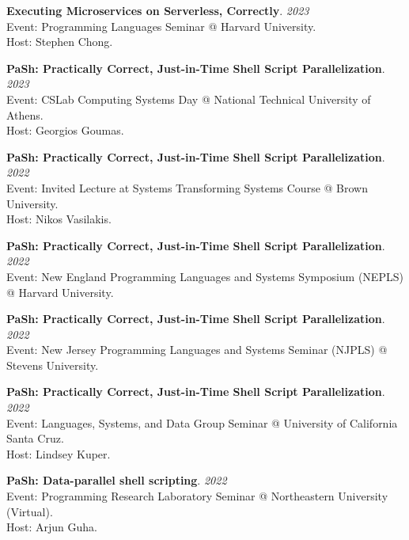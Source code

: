 \begin{minipage}{\textwidth}
\textbf{Executing Microservices on Serverless, Correctly}. \hfill {\em 2023}\\
Event: Programming Languages Seminar @ Harvard University.\\
 Host: Stephen Chong.
\end{minipage}

\begin{minipage}{\textwidth}
\textbf{PaSh: Practically Correct, Just-in-Time Shell Script Parallelization}. \hfill {\em 2023}\\
Event: CSLab Computing Systems Day @ National Technical University of Athens.\\
 Host: Georgios Goumas.
\end{minipage}

\begin{minipage}{\textwidth}
\textbf{PaSh: Practically Correct, Just-in-Time Shell Script Parallelization}. \hfill {\em 2022}\\
Event: Invited Lecture at Systems Transforming Systems Course @ Brown University.\\
 Host: Nikos Vasilakis.
\end{minipage}

\begin{minipage}{\textwidth}
\textbf{PaSh: Practically Correct, Just-in-Time Shell Script Parallelization}. \hfill {\em 2022}\\
Event: New England Programming Languages and Systems Symposium (NEPLS) @ Harvard University.
\end{minipage}

\begin{minipage}{\textwidth}
\textbf{PaSh: Practically Correct, Just-in-Time Shell Script Parallelization}. \hfill {\em 2022}\\
Event: New Jersey Programming Languages and Systems Seminar (NJPLS) @ Stevens University.
\end{minipage}

\begin{minipage}{\textwidth}
\textbf{PaSh: Practically Correct, Just-in-Time Shell Script Parallelization}. \hfill {\em 2022}\\
Event: Languages, Systems, and Data Group Seminar @ University of California Santa Cruz.\\
 Host: Lindsey Kuper.
\end{minipage}

\begin{minipage}{\textwidth}
\textbf{PaSh: Data-parallel shell scripting}. \hfill {\em 2022}\\
Event: Programming Research Laboratory Seminar @ Northeastern University (Virtual).\\
 Host: Arjun Guha.
\end{minipage}

